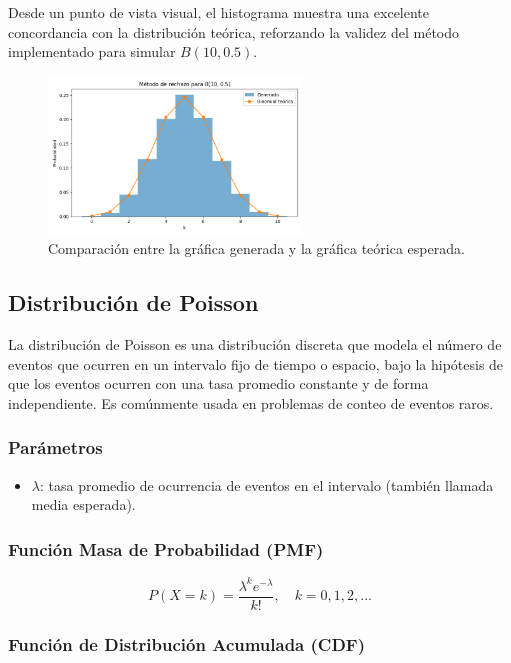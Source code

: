 \documentclass{article}
\begin{document}
Desde un punto de vista visual, el histograma muestra una excelente concordancia con la distribución teórica, reforzando la validez del método implementado para simular $B(10, 0.5)$.

\begin{figure}[H]
    \centering
    \includegraphics[width=0.6\textwidth]{visualizaciones/binomial_rechazo.png}
    \caption{Comparación entre la gráfica generada y la gráfica teórica esperada.}
    \label{fig:binomial_rechazo}
\end{figure}

\subsection{Distribución de Poisson}

La distribución de Poisson es una distribución discreta que modela el número de eventos que ocurren en un intervalo fijo de tiempo o espacio, bajo la hipótesis de que los eventos ocurren con una tasa promedio constante y de forma independiente. Es comúnmente usada en problemas de conteo de eventos raros.

\subsubsection*{Parámetros}
\begin{itemize}
  \item $\lambda$: tasa promedio de ocurrencia de eventos en el intervalo (también llamada media esperada).
\end{itemize}

\subsubsection*{Función Masa de Probabilidad (PMF)}
\[
P(X = k) = \frac{\lambda^k e^{-\lambda}}{k!}, \quad k = 0, 1, 2, \ldots
\]

\subsubsection*{Función de Distribución Acumulada (CDF)}
\end{document}
